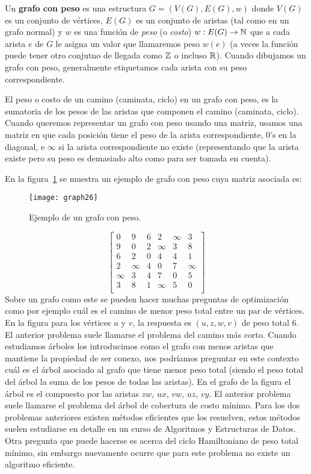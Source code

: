 \begin{definicion}
Un {\bf grafo con peso} es una estructura $G=(V(G),E(G),w)$ donde $V(G)$ es un conjunto de vértices, $E(G)$ es un conjunto de aristas (tal como en un grafo normal) y $w$ es una función de \emph{peso} (o \emph{costo}) $w:E(G)\rightarrow\mathbb{N}$ que a cada arista $e$ de $G$ le asigna un valor que llamaremos peso $w(e)$ (a veces la función puede tener otro conjutno de llegada como $\mathbb{Z}$ o incluso $\mathbb{R}$).
Cuando dibujamos un grafo con peso, generalmente etiquetamos cada arista con su peso correspondiente.

El peso o costo de un camino (caminata, ciclo) en un grafo con peso, es la sumatoria de los pesos de las aristas que componen el camino (caminata, ciclo).
Cuando queremos representar un grafo con peso usando una matriz, usamos una matriz en que cada posición tiene el peso de la arista correspondiente, $0$'s en la diagonal, e $\infty$ si la arista correspondiente no existe (representando que la arista existe pero su peso es demasiado alto como para ser tomada en cuenta).
\end{definicion}

En la figura~\ref{fig:graph26} se muestra un ejemplo de grafo con peso cuya matriz asociada es:
\begin{figure}
\centering
\texttt{[image: graph26]}
\caption{Ejemplo de un grafo con peso.}
\label{fig:graph26}
\end{figure}
\[
\left[
\begin{array}{cccccc}
0 & 9 & 6 & 2 & \infty & 3 \\
9 & 0 & 2 & \infty & 3 & 8 \\
6 & 2 & 0 & 4 & 4 & 1 \\
2 & \infty & 4 & 0 & 7 & \infty \\
\infty & 3 & 4 & 7 & 0 & 5 \\
3 & 8 & 1 &\infty & 5 & 0 \\
\end{array}\right]
\]
Sobre un grafo como este se pueden hacer muchas preguntas de optimización como por ejemplo cuál es el camino de menor peso total entre un par de vértices.
En la figura para los vértices $u$ y $v$, la respuesta es $(u,z,w,v)$ de peso total $6$.
El anterior problema suele llamarse el problema del camino más corto.
Cuando estudiamos árboles los introducimos como el grafo con menos aristas que mantiene la propiedad de ser conexo, nos podríamos preguntar en este contexto cuál es el árbol asociado al grafo que tiene menor peso total (siendo el peso total del árbol la suma de los pesos de todas las aristas).
En el grafo de la figura el árbol es el compuesto por las aristas $zw$, $ux$, $vw$, $uz$, $vy$.
El anterior problema suele llamarse el problema del árbol de cobertura de costo mínimo.
Para los dos problemas anteriores existen métodos eficientes que los resuelven, estos métodos suelen estudiarse en detalle en un curso de Algoritmos y Estructuras de Datos.
Otra pregunta que puede hacerse es acerca del ciclo Hamiltoniano de peso total mínimo, sin embargo nuevamente ocurre que para este problema no existe un algoritmo eficiente.

